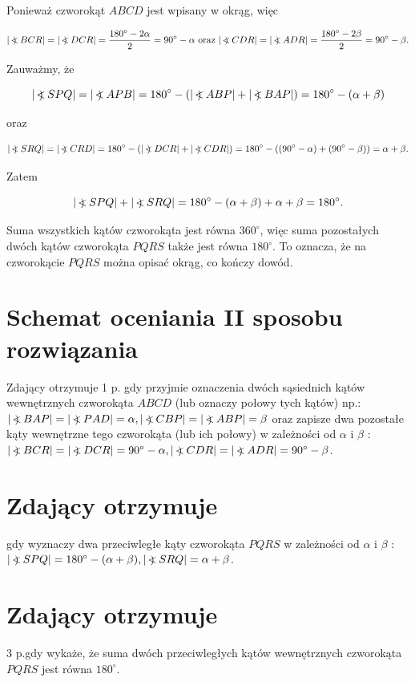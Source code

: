 \documentclass[10pt]{article}
\newcommand\Varangle{\mathop{{<\!\!\!\!\!\text{\small)}}\:}\nolimits}
\begin{document}
Ponieważ czworokąt $A B C D$ jest wpisany w okrąg, więc

$$
|\Varangle B C R|=|\Varangle D C R|=\frac{180^{\circ}-2 \alpha}{2}=90^{\circ}-\alpha \text { oraz }|\Varangle C D R|=|\Varangle A D R|=\frac{180^{\circ}-2 \beta}{2}=90^{\circ}-\beta .
$$

Zauważmy, że

$$
|\Varangle S P Q|=|\Varangle A P B|=180^{\circ}-(|\Varangle A B P|+|\Varangle B A P|)=180^{\circ}-(\alpha+\beta)
$$

oraz

$$
|\Varangle S R Q|=|\Varangle C R D|=180^{\circ}-(|\Varangle D C R|+|\Varangle C D R|)=180^{\circ}-\left(\left(90^{\circ}-\alpha\right)+\left(90^{\circ}-\beta\right)\right)=\alpha+\beta .
$$

Zatem

$$
|\Varangle S P Q|+|\Varangle S R Q|=180^{\circ}-(\alpha+\beta)+\alpha+\beta=180^{\circ} .
$$

Suma wszystkich kątów czworokąta jest równa $360^{\circ}$, więc suma pozostałych dwóch kątów czworokąta $P Q R S$ także jest równa $180^{\circ}$. To oznacza, że na czworokącie $P Q R S$ można opisać okrąg, co kończy dowód.

\section*{Schemat oceniania II sposobu rozwiązania}
Zdający otrzymuje 1 p. gdy przyjmie oznaczenia dwóch sąsiednich kątów wewnętrznych czworokąta $A B C D$ (lub oznaczy połowy tych kątów) np.: $|\Varangle B A P|=|\Varangle P A D|=\alpha,|\Varangle C B P|=|\Varangle A B P|=\beta$ oraz zapisze dwa pozostałe kąty wewnętrzne tego czworokąta (lub ich połowy) w zależności od $\alpha$ i $\beta$ : $|\Varangle B C R|=|\Varangle D C R|=90^{\circ}-\alpha,|\Varangle C D R|=|\Varangle A D R|=90^{\circ}-\beta$.

\section*{Zdający otrzymuje}
gdy wyznaczy dwa przeciwległe kąty czworokąta $P Q R S$ w zależności od $\alpha$ i $\beta$ : $|\Varangle S P Q|=180^{\circ}-(\alpha+\beta),|\Varangle S R Q|=\alpha+\beta$.

\section*{Zdający otrzymuje}
 3 p.gdy wykaże, że suma dwóch przeciwległych kątów wewnętrznych czworokąta $P Q R S$ jest równa $180^{\circ}$.
\end{document}
